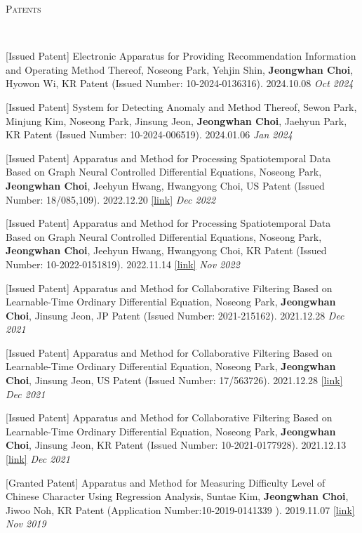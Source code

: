 \documentclass[10pt]{article}
\newenvironment{changemargin}[2]{
  \begin{list}{}{
    \setlength{\topsep}{0pt}
    \setlength{\leftmargin}{#1}
    \setlength{\rightmargin}{#2}
    \setlength{\listparindent}{\parindent}
    \setlength{\itemindent}{\parindent}
    \setlength{\parsep}{\parskip}
  }
  \item[]}{\end{list}
}
\newcommand{\lineover}{
	\begin{changemargin}{-0.05in}{-0.05in}
		\vspace*{-8pt}
		\hrulefill \\
		\vspace*{-2pt}
	\end{changemargin}
}
\newcommand{\header}[1]{
	\begin{changemargin}{-0.5in}{-0.5in}
		\scshape{#1}\\
  	\lineover
	\end{changemargin}
}
\newcommand{\presentation}[2]{
	{#1} \hfill \emph{#2}\\ \bigskip
}
\newenvironment{body} {
	\vspace*{-16pt}
	\begin{changemargin}{-0.25in}{-0.5in}
  }
	{\end{changemargin}
}
\begin{document}
\medskip
\pagebreak

\header{Patents}

\begin{body}
	\vspace{14pt}
	
\presentation{[Issued Patent] Electronic Apparatus for Providing Recommendation Information and Operating Method Thereof, Noseong Park, Yehjin Shin, \textbf{Jeongwhan Choi}, Hyowon Wi, KR Patent (Issued Number: 10-2024-0136316). 2024.10.08}{Oct 2024}	

\presentation{[Issued Patent] System for Detecting Anomaly and Method Thereof, Sewon Park, Minjung Kim, Noseong Park, Jinsung Jeon, \textbf{Jeongwhan Choi}, Jaehyun Park, KR Patent (Issued Number: 10-2024-006519). 2024.01.06 }{Jan 2024}

\presentation{[Issued Patent] Apparatus and Method for Processing Spatiotemporal Data Based on Graph Neural Controlled Differential Equations, Noseong Park, \textbf{Jeongwhan Choi}, Jeehyun Hwang, Hwangyong Choi, US Patent (Issued Number: 18/085,109). 2022.12.20 \href{https://patents.google.com/patent/US20230186105A1/en}{[link]}}{Dec 2022}	

\presentation{[Issued Patent] Apparatus and Method for Processing Spatiotemporal Data Based on Graph Neural Controlled Differential Equations, Noseong Park, \textbf{Jeongwhan Choi}, Jeehyun Hwang, Hwangyong Choi, KR Patent (Issued Number: 10-2022-0151819). 2022.11.14 \href{https://patents.google.com/patent/KR20240073179A/en}{[link]}}{Nov 2022}

\presentation{[Issued Patent] Apparatus and Method for Collaborative Filtering Based on Learnable-Time Ordinary Differential Equation, Noseong Park, \textbf{Jeongwhan Choi}, Jinsung Jeon, JP Patent (Issued Number: 2021-215162). 2021.12.28}{Dec 2021}	

\presentation{[Issued Patent] Apparatus and Method for Collaborative Filtering Based on Learnable-Time Ordinary Differential Equation, Noseong Park, \textbf{Jeongwhan Choi}, Jinsung Jeon, US Patent (Issued Number: 	17/563726). 2021.12.28 \href{https://patents.google.com/patent/US20230186105A1/en}{[link]}}{Dec 2021}	

\presentation{[Issued Patent] Apparatus and Method for Collaborative Filtering Based on Learnable-Time Ordinary Differential Equation, Noseong Park, \textbf{Jeongwhan Choi}, Jinsung Jeon, KR Patent (Issued Number: 10-2021-0177928). 2021.12.13 \href{http://kpat.kipris.or.kr/kpat/biblioa.do?method=biblioFrame}{[link]}}{Dec 2021}

\presentation{[Granted Patent] Apparatus and Method for Measuring Difficulty Level of Chinese Character Using Regression Analysis, Suntae Kim, \textbf{Jeongwhan Choi}, Jiwoo Noh, KR Patent (Application Number:10-2019-0141339 ). 2019.11.07 \href{https://doi.org/10.8080/1020190141339}{[link]}}{Nov 2019}	
  
\end{body}
    
\end{document}
